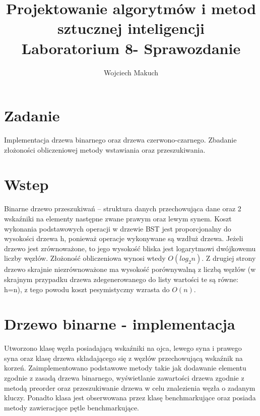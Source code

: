 
\title{Projektowanie algorytmów i metod sztucznej inteligencji\\Laboratorium  8- Sprawozdanie}
\author{Wojciech Makuch}
\date{}

%
	\maketitle
	\section{Zadanie}\label{sec:Zadanie}
	Implementacja drzewa binarnego oraz drzewa czerwono-czarnego. Zbadanie złożoności obliczeniowej metody wstawiania oraz przeszukiwania.
	
	\section{Wstep}\label{sec:Wstep}
	Binarne drzewo przeszukiwań – struktura danych przechowująca dane oraz 2 wskaźniki na elementy następne zwane prawym oraz lewym synem. Koszt wykonania podstawowych operacji w drzewie BST jest proporcjonalny do wysokości drzewa h, ponieważ operacje wykonywane są wzdłuż drzewa. Jeżeli drzewo jest zrównoważone, to jego wysokość bliska jest logarytmowi dwójkowemu liczby węzłów. Złożoność obliczeniowa wynosi wtedy $O(log_{2}n)$. Z drugiej strony drzewo skrajnie niezrównoważone ma wysokość porównywalną z liczbą węzłów (w skrajnym przypadku drzewa zdegenerowanego do listy wartości te są równe: h=n), z tego powodu koszt pesymistyczny wzrasta do $O(n)$. 
	
	\section{Drzewo binarne - implementacja}\label{sec:Drzewo binarne - implementacja}
	Utworzono klasę węzła posiadającą wskaźniki na ojca, lewego syna i prawego syna oraz klasę drzewa składającego się z węzłów przechowującą wskaźnik na korzeń. Zaimplementowano podstawowe metody takie jak dodawanie elementu zgodnie z zasadą drzewa binarnego, wyświetlanie zawartości drzewa zgodnie z metodą preorder oraz przeszukiwanie drzewa w celu znalezienia węzła o zadanym kluczy. Ponadto klasa jest obserwowana przez klasę benchmarkujące oraz posiada metody zawieracjące pętle benchmarkujące.  
	
